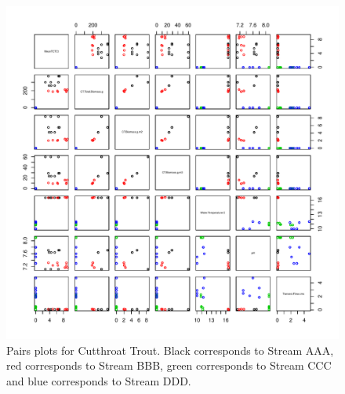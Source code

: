 \begin{figure}[H]
\includegraphics{AppendixImages/Ctpairs.pdf}
\caption{ \hspace{1mm}    Pairs plots for Cutthroat Trout. Black corresponds to Stream AAA, red corresponds to Stream BBB, green corresponds to Stream CCC and blue corresponds to Stream DDD.}
\label{fig:pairct}
\end{figure}



